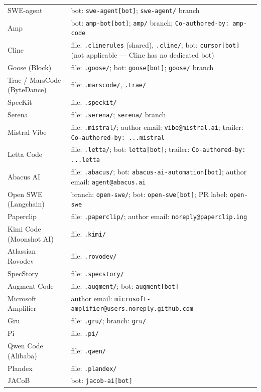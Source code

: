 \documentclass[9pt,a4paper]{article}
\begin{document}
\begin{tabular}{@{}lp{13.5cm}@{}}
SWE-agent &
  bot: \texttt{swe-agent[bot]}; \texttt{swe-agent/} branch \\[2pt]
Amp &
  bot: \texttt{amp-bot[bot]}; \texttt{amp/} branch;
  \texttt{Co-authored-by: amp-code} \\[2pt]
Cline &
  file: \texttt{.clinerules} (shared), \texttt{.cline/};
  bot: \texttt{cursor[bot]} (not applicable --- Cline has no dedicated bot) \\[2pt]
Goose (Block) &
  file: \texttt{.goose/};
  bot: \texttt{goose[bot]}; \texttt{goose/} branch \\[2pt]
Trae / MarsCode (ByteDance) &
  file: \texttt{.marscode/}, \texttt{.trae/} \\[2pt]
SpecKit &
  file: \texttt{.speckit/} \\[2pt]
Serena &
  file: \texttt{.serena/}; \texttt{serena/} branch \\[2pt]
Mistral Vibe &
  file: \texttt{.mistral/};
  author email: \texttt{vibe@mistral.ai};
  trailer: \texttt{Co-authored-by: ...mistral} \\[2pt]
Letta Code &
  file: \texttt{.letta/};
  bot: \texttt{letta[bot]};
  trailer: \texttt{Co-authored-by: ...letta} \\[2pt]
Abacus AI &
  file: \texttt{.abacus/};
  bot: \texttt{abacus-ai-automation[bot]};
  author email: \texttt{agent@abacus.ai} \\[2pt]
Open SWE (Langchain) &
  branch: \texttt{open-swe/}; bot: \texttt{open-swe[bot]}; PR label: \texttt{open-swe} \\[2pt]
Paperclip &
  file: \texttt{.paperclip/}; author email: \texttt{noreply@paperclip.ing} \\[2pt]
Kimi Code (Moonshot AI) &
  file: \texttt{.kimi/} \\[2pt]
Atlassian Rovodev &
  file: \texttt{.rovodev/} \\[2pt]
SpecStory &
  file: \texttt{.specstory/} \\[2pt]
Augment Code &
  file: \texttt{.augment/}; bot: \texttt{augment[bot]} \\[2pt]
Microsoft Amplifier &
  author email: \texttt{microsoft-amplifier@users.noreply.github.com} \\[2pt]
Gru &
  file: \texttt{.gru/}; branch: \texttt{gru/} \\[2pt]
Pi &
  file: \texttt{.pi/} \\[2pt]
Qwen Code (Alibaba) &
  file: \texttt{.qwen/} \\[2pt]
Plandex &
  file: \texttt{.plandex/} \\[2pt]
JACoB &
  bot: \texttt{jacob-ai[bot]} \\
\bottomrule
\end{tabular}
\end{document}
